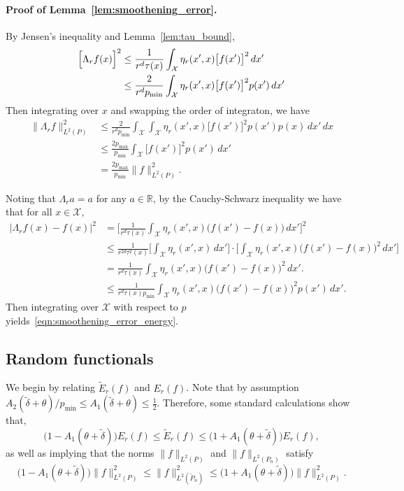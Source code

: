 \documentclass[twoside]{article}
\newcommand{\Reals}{\mathbb{R}}
\newcommand{\1}{\mathbf{1}}
\newcommand{\Xset}{\mathcal{X}}
\newcommand{\Leb}{L}
\newcommand{\wt}[1]{\widetilde{#1}}
\theoremstyle{definition}
\theoremstyle{remark}
\begin{document}
\paragraph{Proof of Lemma~\ref{lem:smoothening_error}.}
By Jensen's inequality and Lemma~\ref{lem:tau_bound},
\begin{align*}
\Bigl[\Lambda_rf(x)\Bigr]^2 & \leq \frac{1}{r^d \tau(x)}\int_{\Xset} \eta_r(x',x) \bigl[f(x')\bigr]^2 \,dx' \\
& \leq \frac{2}{r^d p_{\min}}\int_{\Xset} \eta_r(x',x) \bigl[f(x')\bigr]^2 p(x') \,dx'
\end{align*}
Then integrating over $x$ and swapping the order of integraton, we have
\begin{align*}
\bigl\|\Lambda_rf\bigr\|_{\Leb^2(P)}^2 & \leq \frac{2}{r^d p_{\min}} \int_{\Xset} \int_{\Xset} \eta_r(x',x) \bigl[f(x')\bigr]^2 p(x') p(x) \,dx' \,dx \\ 
& \leq \frac{2p_{\max}}{p_{\min}} \int_{\Xset} \bigl[f(x')\bigr]^2 p(x') \,dx' \\
& = \frac{2p_{\max}}{p_{\min}} \|f\|_{\Leb^2(P)}^2.
\end{align*}

Noting that $\Lambda_ra = a$ for any $a \in \Reals$, by the Cauchy-Schwarz inequality we have that for all $x \in \Xset$,
\begin{align*}
\bigl|\Lambda_rf(x) - f(x)\bigr|^2 & = \biggl[\frac{1}{r^d\tau(x)} \int_{\Xset} \eta_r(x',x) \bigl(f(x') - f(x)\bigr) \,dx'\biggr]^2 \\
& \leq \frac{1}{r^{2d} \tau^2(x)} \biggl[\int_{\Xset} \eta_r(x',x) \,dx'\biggr] \cdot \biggl[\int_{\Xset} \eta_r(x',x) \bigl(f(x') - f(x)\bigr)^2 \,dx'\biggr] \\
& = \frac{1}{r^d \tau(x)} \int_{\Xset} \eta_r(x',x) \bigl(f(x') - f(x)\bigr)^2 \,dx'. \\
& \leq \frac{1}{r^d \tau(x) p_{\min}} \int_{\Xset} \eta_r(x',x) \bigl(f(x') - f(x)\bigr)^2 p(x') \,dx'.
\end{align*}
Then integrating over $\Xset$ with respect to $p$ yields~\eqref{eqn:smoothening_error_energy}.



\subsection{Random functionals}
\label{subsec:random_functionals}

We begin by relating $\wt{E}_r(f)$ and $E_r(f)$. Note that by assumption $A_2(\wt{\delta} + \theta)/p_{\min} \leq A_1(\wt{\delta} + \theta) \leq \frac{1}{2}$. Therefore, some standard calculations show that,
\begin{equation}
\label{eqn:calder19_1}
\bigl(1 - A_1(\theta + \wt{\delta})\bigr) E_r(f) \leq \wt{E}_r(f) \leq \bigl(1 + A_1(\theta + \wt{\delta})\bigr) E_r(f),
\end{equation}
as well as implying that the norms $\|f\|_{\Leb^2(P)}$ and $\|f\|_{\Leb^2(P_n)}$ satisfy
\begin{equation}
\label{eqn:calder19_2}
\bigl(1 - A_1(\theta + \wt{\delta})\bigr) \|f\|_{\Leb^2(P)}^2 \leq \|f\|_{\Leb^2(\wt{P}_n)}^2 \leq \bigl(1 + A_1(\theta + \wt{\delta})\bigr) \|f\|_{\Leb^2(P)}^2.
\end{equation}
\end{document}
